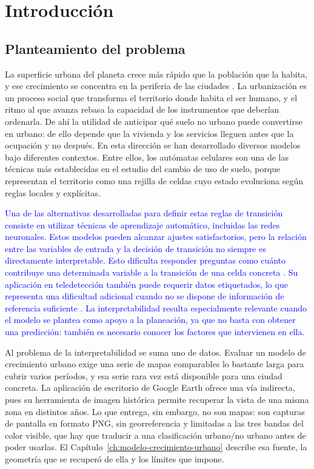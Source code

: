 
\chapter{Introducción}
\label{ch:introduccion}

\section{Planteamiento del problema}

La superficie urbana del planeta crece más rápido que la población que la habita, y ese crecimiento se concentra en la periferia de las ciudades \parencite{Seto2012,UNHabitat2020,Angel2012}. La urbanización es un proceso social que transforma el territorio donde habita el ser humano, y el ritmo al que avanza rebasa la capacidad de los instrumentos que deberían ordenarla. De ahí la utilidad de anticipar qué suelo no urbano puede convertirse en urbano: de ello depende que la vivienda y los servicios lleguen antes que la ocupación y no después. En esta dirección se han desarrollado diversos modelos bajo diferentes contextos. Entre ellos, los autómatas celulares son una de las técnicas más establecidas en el estudio del cambio de uso de suelo, porque representan el territorio como una rejilla de celdas cuyo estado evoluciona según reglas locales y explícitas.

\textcolor{blue}{Una de las alternativas desarrolladas para definir estas reglas de transición consiste en utilizar técnicas de aprendizaje automático, incluidas las redes neuronales. Estos modelos pueden alcanzar ajustes satisfactorios, pero la relación entre las variables de entrada y la decisión de transición no siempre es directamente interpretable. Esto dificulta responder preguntas como cuánto contribuye una determinada variable a la transición de una celda concreta \parencite{almeida2008stochastic}. Su aplicación en teledetección también puede requerir datos etiquetados, lo que representa una dificultad adicional cuando no se dispone de información de referencia suficiente \parencite{Ma2019}. La interpretabilidad resulta especialmente relevante cuando el modelo se plantea como apoyo a la planeación, ya que no basta con obtener una predicción: también es necesario conocer los factores que intervienen en ella.}

Al problema de la interpretabilidad se suma uno de datos. Evaluar un modelo de crecimiento urbano exige una serie de mapas comparables lo bastante larga para cubrir varios períodos, y esa serie rara vez está disponible para una ciudad concreta. La aplicación de escritorio de Google Earth ofrece una vía indirecta, pues su herramienta de imagen histórica permite recuperar la vista de una misma zona en distintos años. Lo que entrega, sin embargo, no son mapas: son capturas de pantalla en formato PNG, sin georreferencia y limitadas a las tres bandas del color visible, que hay que traducir a una clasificación urbano/no urbano antes de poder usarlas. El Capítulo~\ref{ch:modelo-crecimiento-urbano} describe esa fuente, la geometría que se recuperó de ella y los límites que impone.

